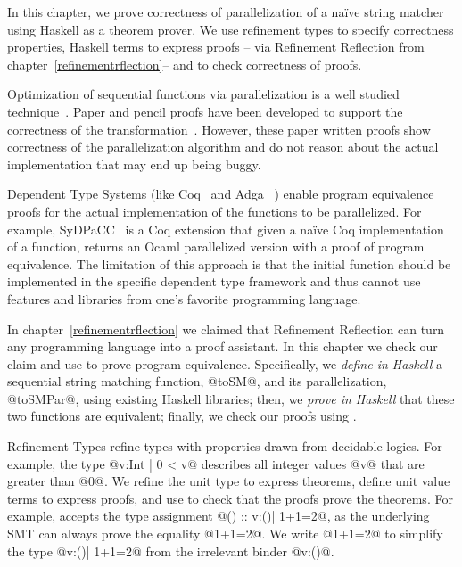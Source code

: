 In this chapter,
we prove correctness of parallelization of a na\"ive string matcher
using Haskell as a theorem prover.
%
We use refinement types to specify correctness properties,
Haskell terms to express proofs 
-- via Refinement Reflection from chapter~\ref{refinementrflection}--
and \toolname to check correctness of proofs.

Optimization of sequential functions via parallelization
is a well studied technique~\cite{jaja,blelloch}.
%
Paper and pencil proofs have been developed to support the
correctness of the transformation~\cite{Cole93parallelprogramming}.
%
However, these paper written proofs
show correctness of the parallelization algorithm
and do not reason about the actual implementation
that may end up being buggy.

Dependent Type Systems (like Coq~\cite{coq-book} and Adga~\cite{agda} )
enable program equivalence proofs
for the actual implementation of the functions to be parallelized.
%
For example, SyDPaCC~\cite{SyDPaCC} is a Coq extension that
given a na\"ive Coq implementation of a function,
returns an Ocaml parallelized version with a proof of program equivalence.
%
The limitation of this approach is that the initial
function should be implemented in
the specific dependent type framework
and thus cannot use features and libraries from one's favorite
programming language.

In chapter~\ref{refinementrflection}
we claimed that Refinement Reflection can turn any programming
language into a proof assistant.
%
In this chapter we check our claim and use \toolname
to prove program equivalence.
%
Specifically,
we \textit{define in Haskell}
a sequential string matching function, @toSM@, and its parallelization, @toSMPar@,
using existing Haskell libraries; then,
we \textit{prove in Haskell} that these two functions are equivalent;
finally, we check our proofs using \toolname.

Refinement Types refine types with properties
drawn from decidable logics.
For example, the type @{v:Int | 0 < v}@
describes all integer values @v@ that are greater than @0@.
%
We refine the unit type to express theorems,
define unit value terms to express proofs, and use
\toolname to check that the proofs prove the theorems.
%
For example, \toolname accepts
the type assignment @() :: {v:()| 1+1=2}@,
as the underlying SMT can always prove the equality @1+1=2@.
%
We write @{1+1=2}@ to simplify the type @{v:()| 1+1=2}@
from the irrelevant binder @v:()@.


